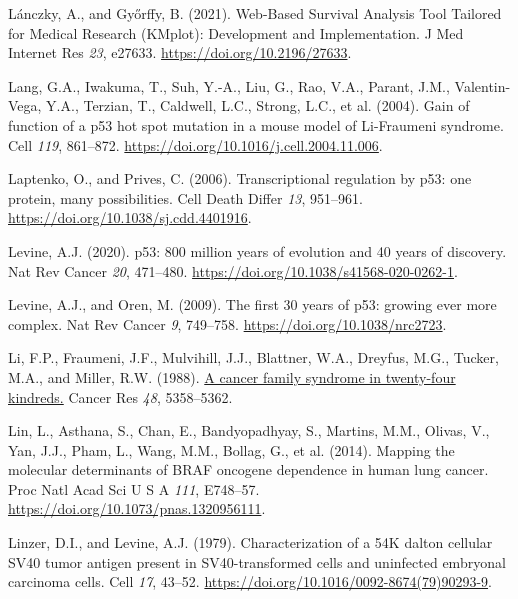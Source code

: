 \begin{CSLReferences}{0}{0}
\leavevmode{}%
Lánczky, A., and Győrffy, B. (2021). Web-Based Survival Analysis Tool Tailored for Medical Research (KMplot): Development and Implementation. J Med Internet Res \emph{23}, e27633. \url{https://doi.org/10.2196/27633}.

\leavevmode{}%
Lang, G.A., Iwakuma, T., Suh, Y.-A., Liu, G., Rao, V.A., Parant, J.M., Valentin-Vega, Y.A., Terzian, T., Caldwell, L.C., Strong, L.C., et al. (2004). Gain of function of a p53 hot spot mutation in a mouse model of Li-Fraumeni syndrome. Cell \emph{119}, 861--872. \url{https://doi.org/10.1016/j.cell.2004.11.006}.

\leavevmode{}%
Laptenko, O., and Prives, C. (2006). Transcriptional regulation by p53: one protein, many possibilities. Cell Death Differ \emph{13}, 951--961. \url{https://doi.org/10.1038/sj.cdd.4401916}.

\leavevmode{}%
Levine, A.J. (2020). p53: 800 million years of evolution and 40 years of discovery. Nat Rev Cancer \emph{20}, 471--480. \url{https://doi.org/10.1038/s41568-020-0262-1}.

\leavevmode{}%
Levine, A.J., and Oren, M. (2009). The first 30 years of p53: growing ever more complex. Nat Rev Cancer \emph{9}, 749--758. \url{https://doi.org/10.1038/nrc2723}.

\leavevmode{}%
Li, F.P., Fraumeni, J.F., Mulvihill, J.J., Blattner, W.A., Dreyfus, M.G., Tucker, M.A., and Miller, R.W. (1988). \href{https://www.ncbi.nlm.nih.gov/pubmed/3409256}{A cancer family syndrome in twenty-four kindreds.} Cancer Res \emph{48}, 5358--5362.

\leavevmode{}%
Lin, L., Asthana, S., Chan, E., Bandyopadhyay, S., Martins, M.M., Olivas, V., Yan, J.J., Pham, L., Wang, M.M., Bollag, G., et al. (2014). Mapping the molecular determinants of BRAF oncogene dependence in human lung cancer. Proc Natl Acad Sci U S A \emph{111}, E748--57. \url{https://doi.org/10.1073/pnas.1320956111}.

\leavevmode{}%
Linzer, D.I., and Levine, A.J. (1979). Characterization of a 54K dalton cellular SV40 tumor antigen present in SV40-transformed cells and uninfected embryonal carcinoma cells. Cell \emph{17}, 43--52. \url{https://doi.org/10.1016/0092-8674(79)90293-9}.


\end{CSLReferences}
